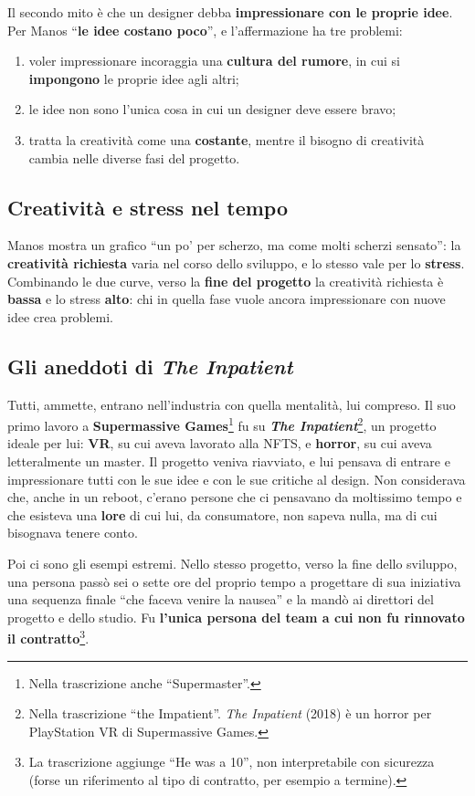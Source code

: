 Il secondo mito è che un designer debba \textbf{impressionare con le proprie
idee}. Per Manos ``\textbf{le idee costano poco}'', e l'affermazione ha tre
problemi:
\begin{enumerate}
  \item voler impressionare incoraggia una \textbf{cultura del rumore}, in cui si
        \textbf{impongono} le proprie idee agli altri;
  \item le idee non sono l'unica cosa in cui un designer deve essere bravo;
  \item tratta la creatività come una \textbf{costante}, mentre il bisogno di
        creatività cambia nelle diverse fasi del progetto.
\end{enumerate}

\subsection{Creatività e stress nel tempo}

Manos mostra un grafico ``un po' per scherzo, ma come molti scherzi sensato'': la
\textbf{creatività richiesta} varia nel corso dello sviluppo, e lo stesso vale per
lo \textbf{stress}. Combinando le due curve, verso la \textbf{fine del progetto}
la creatività richiesta è \textbf{bassa} e lo stress \textbf{alto}: chi in quella
fase vuole ancora impressionare con nuove idee crea problemi.

\subsection{Gli aneddoti di \emph{The Inpatient}}

Tutti, ammette, entrano nell'industria con quella mentalità, lui compreso. Il suo
primo lavoro a \textbf{Supermassive Games}\footnote{Nella trascrizione anche
``Supermaster''.} fu su \textbf{\emph{The Inpatient}}\footnote{Nella trascrizione
``the Impatient''. \emph{The Inpatient} (2018) è un horror per PlayStation VR di
Supermassive Games.}, un progetto ideale per lui: \textbf{VR}, su cui aveva
lavorato alla NFTS, e \textbf{horror}, su cui aveva letteralmente un master.
Il progetto veniva riavviato, e lui pensava di entrare e impressionare tutti con le
sue idee e con le sue critiche al design. Non considerava che, anche in un reboot,
c'erano persone che ci pensavano da moltissimo tempo e che esisteva una
\textbf{lore} di cui lui, da consumatore, non sapeva nulla, ma di cui bisognava
tenere conto.

Poi ci sono gli esempi estremi. Nello stesso progetto, verso la fine dello
sviluppo, una persona passò sei o sette ore del proprio tempo a progettare di sua
iniziativa una sequenza finale ``che faceva venire la nausea'' e la mandò ai
direttori del progetto e dello studio. Fu \textbf{l'unica persona del team a cui
non fu rinnovato il contratto}\footnote{La trascrizione aggiunge ``He was a 10'',
non interpretabile con sicurezza (forse un riferimento al tipo di contratto, per
esempio a termine).}.

